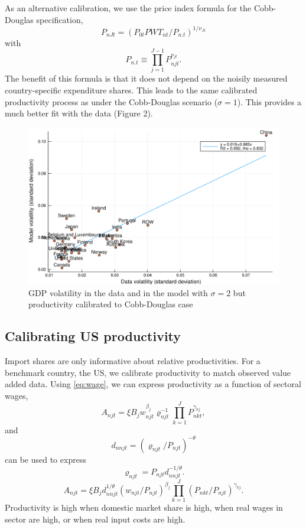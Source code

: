 \documentclass[12pt]{article}
\begin{document}
As an alternative calibration, we use the price index formula for the Cobb-Douglas specification,
\[
P_{nJt} = (P_{0t}PWT_{nt}/P_{n.t})^{1/\nu_{Jt}}
\]
with
\[
P_{n.t} \equiv \prod_{j=1}^{J-1}P_{njt}^{\nu_{jt}}.
\]
The benefit of this formula is that it does not depend on the noisily measured country-specific expenditure shares. This leads to the same calibrated productivity process as under the Cobb-Douglas scenario ($\sigma=1$). This provides a much better fit with the data (Figure 2).

\begin{figure}
\includegraphics[width=\linewidth]{EOS2-model-data.pdf}
\caption{GDP volatility in the data and in the model with $\sigma=2$ but productivity calibrated to Cobb-Douglas case}
\end{figure}

\subsection{Calibrating US productivity}
Import shares are only informative about relative productivities. For a benchmark country, the US, we calibrate productivity to match observed value added data. Using \eqref{eq:wage}, we can express productivity as a function of sectoral wages,
\begin{equation*}\label{eq:value_added}
A_{njt} =
	\xi B_j
	w_{njt}^{\beta_j}
	\varrho_{njt}^{-1}  	
	\prod_{k=1}^J P_{nkt}^{\gamma_{kj}},
\end{equation*}
and
\[
d_{nnjt} = (\varrho_{njt}/P_{njt})^{-\theta}
\]
can be used to express
\[
\varrho_{njt} = P_{njt} d_{nnjt}^{-1/\theta}.
\]
\begin{equation}\label{eq:productivity}
A_{njt} =
	\xi B_j
	d_{nnjt}^{1/\theta}
	(w_{njt}/P_{njt})^{\beta_j}
 	\prod_{k=1}^J (P_{nkt}/P_{njt})^{\gamma_{kj}}.
\end{equation}
Productivity is high when domestic market share is high, when real wages in sector are high, or when real input costs are high.
\end{document}
